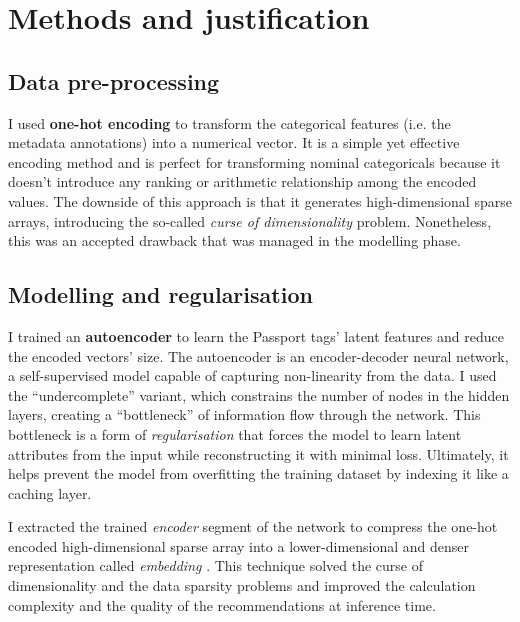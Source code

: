 
\section{Methods and justification}

\subsection{Data pre-processing}

I used \textbf{one-hot encoding} to transform the categorical features (i.e. the metadata annotations) into a numerical vector.
It is a simple yet effective encoding method and is perfect for transforming nominal categoricals because it doesn’t introduce
any ranking or arithmetic relationship among the encoded values.
The downside of this approach is that it generates high-dimensional sparse arrays,
introducing the so-called \textit{curse of dimensionality} problem. Nonetheless, this was an accepted drawback that was
managed in the modelling phase.

\subsection{Modelling and regularisation}

I trained an \textbf{autoencoder} \cite{DBLP:journals/corr/abs-2003-05991,DBLP:journals/corr/abs-2201-03898}
to learn the Passport tags' latent features and reduce the encoded vectors' size.
The autoencoder is an encoder-decoder neural network, a self-supervised model capable of capturing non-linearity from the data.
I used the ``undercomplete'' variant, which constrains the number of nodes in the hidden layers, creating a ``bottleneck''
of information flow through the network.
This bottleneck is a form of \textit{regularisation} that forces the model to learn latent attributes from the input
while reconstructing it with minimal loss. Ultimately, it helps prevent the model from overfitting the training dataset by indexing it like a caching layer.

I extracted the trained \textit{encoder} segment of the network to compress the one-hot encoded high-dimensional sparse array into
a lower-dimensional and denser representation called \textit{embedding} \cite{GoogleForDevelopers:Embeddings}.
This technique solved the curse of dimensionality and the data sparsity problems and improved the calculation
complexity and the quality of the recommendations at inference time.

